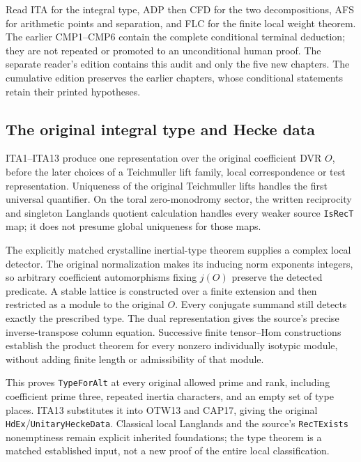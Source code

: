 \documentclass[11pt,a4paper]{article}
\numberwithin{equation}{section}
\theoremstyle{remark}\newtheorem{remark}[theorem]{Remark}
\begin{document}
Read ITA for the integral type, ADP then CFD for the two decompositions,
AFS for arithmetic points and separation, and FLC for the finite local
weight theorem. The earlier CMP1--CMP6 contain the complete conditional
terminal deduction; they are not repeated or promoted to an unconditional
human proof. The separate reader's edition contains this audit and only
the five new chapters. The cumulative edition preserves the earlier
chapters, whose conditional statements retain their printed hypotheses.

\subsection{The original integral type and Hecke data}

ITA1--ITA13 produce one representation over the original coefficient
DVR $O$, before the later choices of a Teichmuller lift family,
local correspondence or test representation. Uniqueness of the original
Teichmuller lifts handles the first universal quantifier. On the toral
zero-monodromy sector, the written reciprocity and singleton Langlands
quotient calculation handles every weaker source \texttt{Is\allowbreak Rec\allowbreak T} map;
it does not presume global uniqueness for those maps.

The explicitly matched crystalline inertial-type theorem supplies a
complex local detector. The original normalization makes its inducing
norm exponents integers, so arbitrary coefficient automorphisms fixing
$j(O)$ preserve the detected predicate. A stable lattice is constructed
over a finite extension and then restricted as a module to the original
$O$. Every conjugate summand still detects exactly the prescribed type.
The dual representation gives the source's precise inverse-transpose
column equation. Successive finite tensor--Hom constructions establish
the product theorem for every nonzero individually isotypic module,
without adding finite length or admissibility of that module.

This proves \texttt{Type\allowbreak For\allowbreak Alt} at every original allowed prime and
rank, including coefficient prime three, repeated inertia characters,
and an empty set of type places. ITA13 substitutes it into OTW13 and
CAP17, giving the original \texttt{Hd\allowbreak Ex}/\texttt{Unitary\allowbreak Hecke\allowbreak Data}.
Classical local Langlands and the source's \texttt{Rec\allowbreak TExists}
nonemptiness remain explicit inherited foundations; the type theorem
is a matched established input, not a new proof of the entire local
classification.
\end{document}

